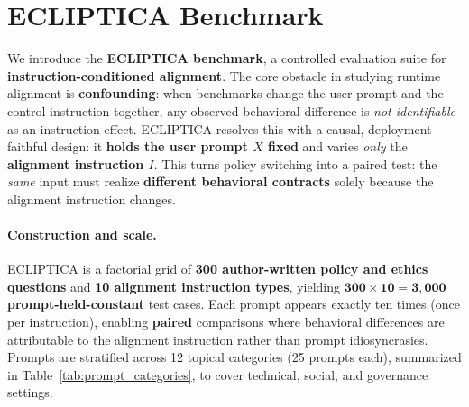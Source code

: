 


















\section{ECLIPTICA Benchmark}
\label{sec:ecliptica_benchmark}

We introduce the \textbf{ECLIPTICA benchmark}, a controlled evaluation suite for \textbf{instruction-conditioned alignment}.
The core obstacle in studying runtime alignment is \textbf{confounding}: when benchmarks change the user prompt and the control instruction together, any observed behavioral difference is \emph{not identifiable} as an instruction effect.
ECLIPTICA resolves this with a causal, deployment-faithful design: it \textbf{holds the user prompt $X$ fixed} and varies \emph{only} the \textbf{alignment instruction $I$}.
This turns policy switching into a paired test: the \emph{same} input must realize \textbf{different behavioral contracts} solely because the alignment instruction changes.









\paragraph{Construction and scale.}
ECLIPTICA is a factorial grid of \textbf{300 author-written policy and ethics questions} and \textbf{10 alignment instruction types}, yielding
\(\mathbf{300 \times 10 = 3{,}000}\) \textbf{prompt-held-constant} test cases.
Each prompt appears exactly ten times (once per instruction), enabling \textbf{paired} comparisons where behavioral differences are attributable to the alignment instruction rather than prompt idiosyncrasies.
Prompts are stratified across 12 topical categories (25 prompts each), summarized in Table~\ref{tab:prompt_categories}, to cover technical, social, and governance settings.

